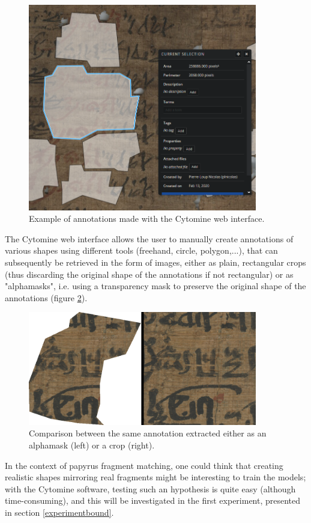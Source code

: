 \documentclass[11pt]{report}
\begin{document}
\begin{figure}[h!]
\centering\includegraphics[width=10cm]{annotation.PNG}
\caption{Example of annotations made with the Cytomine web interface.}
\label{annotation}
\end{figure}

The Cytomine web interface allows the user to manually create annotations of various shapes using different tools (freehand, circle, polygon,...), that can subsequently be retrieved in the form of images, either as plain, rectangular crops (thus discarding the original shape of the annotations if not rectangular) or as "alphamasks", i.e. using a transparency mask to preserve the original shape of the annotations (figure \ref{compcrop}).

\begin{figure}[h!]
\centering\includegraphics[width=10cm]{compcrop.PNG}
\caption{Comparison between the same annotation extracted either as an alphamask (left) or a crop (right).}
\label{compcrop}
\end{figure}

In the context of papyrus fragment matching, one could think that creating realistic shapes mirroring real fragments might be interesting to train the models; with the Cytomine software, testing such an hypothesis is quite easy (although time-consuming), and this will be investigated in the first experiment, presented in section \ref{experimentbound}.
\end{document}
